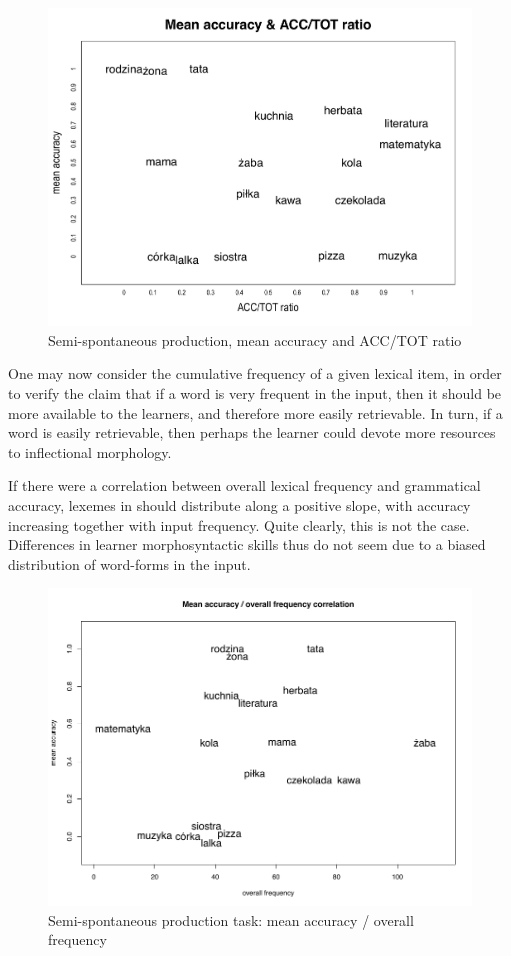 \begin{figure}
    \includegraphics[width=\textwidth]{figures/07-1.pdf}
    \caption{Semi-spontaneous production, mean accuracy and ACC/TOT ratio}
    \label{fig:07:1}
\end{figure}

One may now consider the cumulative frequency of a given lexical item, in order to verify the claim that if a word is very frequent in the input, then it should be more available to the learners, and therefore more easily retrievable. In turn, if a word is easily retrievable, then perhaps the learner could devote more resources to inflectional morphology. 

If there were a correlation between overall lexical frequency and grammatical accuracy, lexemes in  should distribute along a positive slope, with accuracy increasing together with input frequency. Quite clearly, this is not the case. Differences in learner morphosyntactic skills thus do not seem due to a biased distribution of word-forms in the input. 

\begin{figure}
    \includegraphics[width=\textwidth]{figures/07-2.pdf}
    \caption{Semi-spontaneous production task: mean accuracy / overall frequency}
    \label{fig:07:2}
\end{figure}

